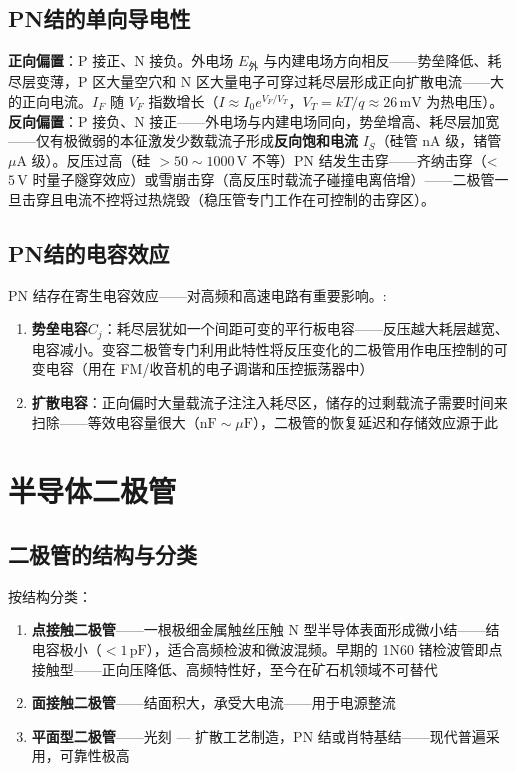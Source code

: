 \documentclass[12pt,UTF8]{ctexbook}
\begin{document}
\subsection{PN结的单向导电性}

\textbf{正向偏置}：P 接正、N 接负。外电场 $E_{\text{外}}$ 与内建电场方向相反——势垒降低、耗尽层变薄，P 区大量空穴和 N 区大量电子可穿过耗尽层形成正向扩散电流——大的正向电流。$I_F$ 随 $V_F$ 指数增长（$I\approx I_0 e^{V_F/V_T}$，$V_T = kT/q\approx26\,\mathrm{mV}$ 为热电压）。\textbf{反向偏置}：P 接负、N 接正——外电场与内建电场同向，势垒增高、耗尽层加宽——仅有极微弱的本征激发少数载流子形成\textbf{反向饱和电流} $I_S$（硅管 nA 级，锗管 $\mu\mathrm{A}$ 级）。反压过高（硅 $>50\sim1000\,\mathrm{V}$ 不等）PN 结发生击穿——齐纳击穿（<$5\,\mathrm{V}$ 时量子隧穿效应）或雪崩击穿（高反压时载流子碰撞电离倍增）——二极管一旦击穿且电流不控将过热烧毁（稳压管专门工作在可控制的击穿区）。

\subsection{PN结的电容效应}

PN 结存在寄生电容效应——对高频和高速电路有重要影响。:
\begin{enumerate}
\item \textbf{势垒电容}$C_j$：耗尽层犹如一个间距可变的平行板电容——反压越大耗层越宽、电容减小。变容二极管专门利用此特性将反压变化的二极管用作电压控制的可变电容（用在 FM/收音机的电子调谐和压控振荡器中）
\item \textbf{扩散电容}：正向偏时大量载流子注注入耗尽区，储存的过剩载流子需要时间来扫除——等效电容量很大（$\mathrm{nF}\sim\mu\mathrm{F}$），二极管的恢复延迟和存储效应源于此
\end{enumerate}

\section{半导体二极管}
\label{sec:semiconductor_diode}

\subsection{二极管的结构与分类}

按结构分类：
\begin{enumerate}
\item \textbf{点接触二极管}——一根极细金属触丝压触 N 型半导体表面形成微小结——结电容极小（$<1\,\mathrm{pF}$），适合高频检波和微波混频。早期的 1N60 锗检波管即点接触型——正向压降低、高频特性好，至今在矿石机领域不可替代
\item \textbf{面接触二极管}——结面积大，承受大电流——用于电源整流
\item \textbf{平面型二极管}——光刻 — 扩散工艺制造，PN 结或肖特基结——现代普遍采用，可靠性极高
\end{enumerate}
\end{document}
